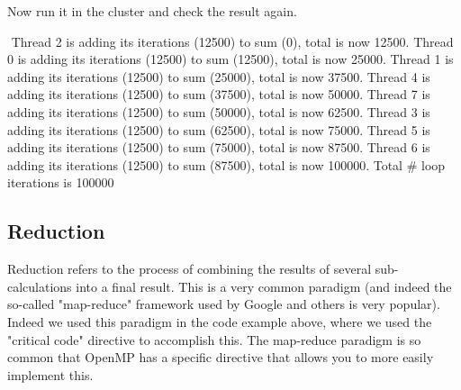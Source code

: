Now run it in the cluster and check the result again.

\begin{prompt}
$ %
$ %
Thread 2 is adding its iterations (12500) to sum (0), total is now 12500.
Thread 0 is adding its iterations (12500) to sum (12500), total is now 25000.
Thread 1 is adding its iterations (12500) to sum (25000), total is now 37500.
Thread 4 is adding its iterations (12500) to sum (37500), total is now 50000.
Thread 7 is adding its iterations (12500) to sum (50000), total is now 62500.
Thread 3 is adding its iterations (12500) to sum (62500), total is now 75000.
Thread 5 is adding its iterations (12500) to sum (75000), total is now 87500.
Thread 6 is adding its iterations (12500) to sum (87500), total is now 100000.
Total \# loop iterations is 100000
\end{prompt}

\subsection{Reduction}

Reduction refers to the process of combining the results of several sub-calculations into a final result. This is a very common paradigm (and indeed the so-called "map-reduce" framework used by Google and others is very popular). Indeed we used this paradigm in the code example above, where we used the "critical code" directive to accomplish this. The map-reduce paradigm is so common that OpenMP has a specific directive that allows you to more easily implement this.



